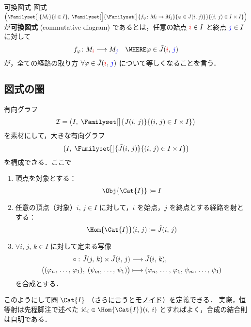 \documentclass[algtopo_main]{subfiles}
\begin{document}
\begin{mydef}[label=def:commutative]{可換図式}
	図式 $\Bigl( \Familyset[\big]{M_i}{i \in I},\; \Familyset[\Big]{\Familyset[\big]{f_\varphi \colon M_i \to M_j}{\varphi \in J(i,\, j)}}{(i,\, j) \in I \times I} \Bigr) $ が\textbf{可換図式} (commutative diagram) であるとは，任意の始点 $\textcolor{red}{i} \in I$ と終点 $\textcolor{blue}{j} \in I$ に対して
	\begin{align}
		f_\varphi \colon M_{\textcolor{red}{i}} \lto M_{\textcolor{blue}{j}}\quad \WHERE \varphi \in \tilde{J}(\textcolor{red}{i},\, \textcolor{blue}{j})
	\end{align}
	が，全ての経路の取り方 $\forall \varphi \in \tilde{J}(\textcolor{red}{i},\, \textcolor{blue}{j})$ について等しくなることを言う．
\end{mydef}

\subsection{図式の圏}

有向グラフ
\begin{align}
	\mathcal{I} = \bigl(I,\; \Familyset[\big]{J(i,\, j)}{(i,\, j) \in I \times I}\bigr)
\end{align}
を素材にして，大きな有向グラフ
\begin{align}
	\label{def:bigDG}
	\bigl(I,\; \Familyset[\big]{\tilde{J}(i,\, j)}{(i,\, j) \in I \times I}\bigr)
\end{align}
を構成できる．ここで
\begin{enumerate}
	\item 頂点を対象とする：
	\begin{align}
		\Obj{\Cat{I}} \coloneqq I
	\end{align}
	\item 任意の頂点（対象）$i,\, j \in I$ に対して，$i$ を始点，$j$ を終点とする経路を射とする：
	\begin{align}
		\Hom{\Cat{I}}(i,\, j) \coloneqq \tilde{J}(i,\, j)
	\end{align}
	\item $\forall i,\, j,\, k \in I$ に対して定まる写像
	\begin{align}
		\circ\mathop{} \colon \tilde{J}(j,\, k) \times \tilde{J}(i,\, j) &\longrightarrow \tilde{J}(i,\, k),\\
		\bigl( (\varphi_n,\, \dots,\, \varphi_1),\; (\psi_m,\, \dots,\, \psi_1) \bigr) &\longmapsto (\varphi_n,\, \dots,\, \varphi_1,\, \psi_m,\, \dots,\, \psi_1)
	\end{align}
	を合成とする．
\end{enumerate}
このようにして\hyperref[def:category]{圏} $\Cat{I}$ （さらに言うと\hyperref[small-monoid]{モノイド}）を定義できる．
実際，恒等射は先程脚注で述べた $\mathrm{id}_{i} \in \Hom{\Cat{I}}(i,\, i)$ とすればよく，合成の結合則は自明である．
\end{document}

